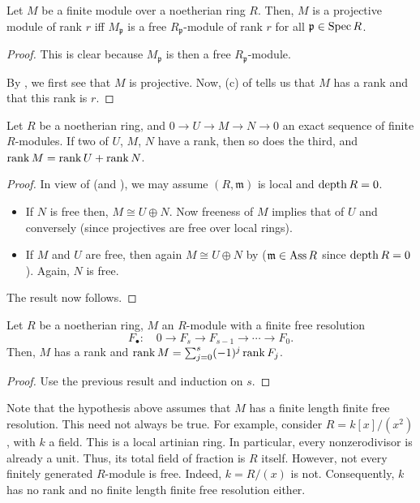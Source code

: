 \documentclass[12pt]{article}
\begin{document}
\begin{cor} \label{cor:projective-rank-iff-locally}
	Let $M$ be a finite module over a noetherian ring $R$. Then, $M$ is a projective module of rank $r$ iff $M_{\mathfrak{p}}$ is a free $R_{\mathfrak{p}}$-module of rank $r$ for all $\mathfrak{p} \in \operatorname{Spec} R$.
\end{cor}
\begin{proof} 
	\forward This is clear because $M_{\mathfrak{p}}$ is then a free $R_{\mathfrak{p}}$-module.

	\backward By , we first see that $M$ is projective. Now, (c) of  tells us that $M$ has a rank and that this rank is $r$.
\end{proof}

\begin{prop} \label{prop:rank-two-out-of-three}
	Let $R$ be a noetherian ring, and $0 \to U \to M \to N \to 0$ an exact sequence of finite $R$-modules. If two of $U$, $M$, $N$ have a rank, then so does the third, and $\operatorname{rank} M = \operatorname{rank} U + \operatorname{rank} N$.
\end{prop}
\begin{proof} 
	In view of  (and ), we may assume $(R, \mathfrak{m})$ is local and $\operatorname{depth} R = 0$. 
	\begin{itemize}
		\item If $N$ is free then, $M \cong U \oplus N$. Now freeness of $M$ implies that of $U$ and conversely (since projectives are free over local rings).
		\item If $M$ and $U$ are free, then again $M \cong U \oplus N$ by  ($\mathfrak{m} \in \operatorname{Ass} R$ since $\operatorname{depth} R = 0$). Again, $N$ is free.
	\end{itemize}
	The result now follows.
\end{proof}

\begin{cor}
	Let $R$ be a noetherian ring, $M$ an $R$-module with a finite free resolution 
	\begin{equation*} 
		F_{\bullet}: \quad 0 \to F_{s} \to F_{s - 1} \to \cdots \to F_{0}.
	\end{equation*}
	Then, $M$ has a rank and $\operatorname{rank} M = \sum_{j = 0}^{s} (-1)^{j} \operatorname{rank} F_{j}$.
\end{cor}
\begin{proof}
	Use the previous result and induction on $s$.
\end{proof}
Note that the hypothesis above assumes that $M$ has a finite length finite free resolution. This need not always be true. For example, consider $R = k[x]/(x^{2})$, with $k$ a field. This is a local artinian ring. In particular, every nonzerodivisor is already a unit. Thus, its total field of fraction is $R$ itself. However, not every finitely generated $R$-module is free. Indeed, $k = R/(x)$ is not. Consequently, $k$ has no rank and no finite length finite free resolution either.
\end{document}
